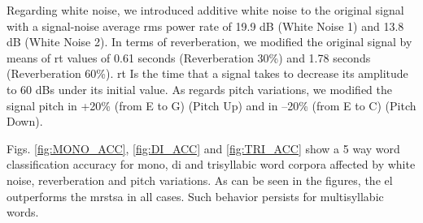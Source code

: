 \documentclass[10pt,letterpaper]{article}
\begin{document}
\pagebreak

Regarding white noise, we introduced additive white noise to the original signal with a signal-noise average \gls{rms} power rate of 19.9 dB (White Noise 1) and 13.8 dB (White Noise 2). In terms of reverberation, we modified the original signal by means of \gls{rt} values of 0.61 seconds (Reverberation 30\%) and 1.78 seconds (Reverberation 60\%). \gls{rt} Is the time that a signal takes to decrease its amplitude to 60 dBs under its initial value. As regards pitch variations, we modified the signal pitch in +20\% (from E to G) (Pitch Up) and in --20\% (from E to C) (Pitch Down).

Figs. \ref{fig:MONO_ACC}, \ref{fig:DI_ACC} and \ref{fig:TRI_ACC}
show a 5 way word classification accuracy for mono, di and trisyllabic word corpora affected by
white noise, reverberation and pitch variations.
As can be seen in the figures, the \gls{el} outperforms the \gls{mrstsa} in all cases.
Such behavior persists for multisyllabic words.
\end{document}
